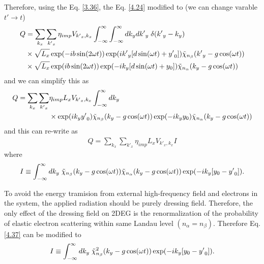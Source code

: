 \noindent
Therefore, using the Eq. \eqref{3.36}, the Eq. \eqref{4.24} modified to (we can change varable $t' \rightarrow t$)
\begin{equation} \label{4.34}
  \begin{aligned}
    Q & =
    \sum_{k_x}\sum_{{k'}_x}
    {\eta_{imp} V_{{k'}_x,k_x}}
    \int_{-\infty}^{\infty} \int_{-\infty}^{\infty} dk_y d{k'}_y \;
    \delta({k'}_y - k_y)
    \\
    & \times
    \sqrt{L_x}
    \exp(
      -ib\sin(2\omega t)
    )
    \exp(
      i{k'}_y  \qty[d\sin(\omega t) + {y'}_0]
    )
    \tilde{\chi}_{n_{\beta}}\qty({k'}_y -g\cos(\omega t))
    \\
    & \times
    \sqrt{L_x}
    \exp(
      ib\sin(2\omega t)
    )
    \exp(
      -ik_y  \qty[d\sin(\omega t) + y_0]
    )
    \tilde{\chi}_{n_{\alpha}}\qty(k_y -g\cos(\omega t))
  \end{aligned}
\end{equation}
and we can simplify this as
\begin{equation} \label{4.35}
  \begin{aligned}
    Q =
    \sum_{k_x}\sum_{{k'}_x} &
    {\eta_{imp} L_x V_{{k'}_x,k_x}}
    \int_{-\infty}^{\infty} dk_y \;
    \\
    & \times
    \exp(
      i{k}_y {y'}_0
    )
    \tilde{\chi}_{n_{\beta}}\qty({k}_y -g\cos(\omega t))
    \exp(
      -ik_y y_0
    )
    \tilde{\chi}_{n_{\alpha}}\qty(k_y -g\cos(\omega t))
  \end{aligned}
\end{equation}
and this can re-write as
\begin{equation} \label{4.36}
  \begin{aligned}
    Q =
    \sum_{k_x}\sum_{{k'}_x}
    {\eta_{imp} L_x V_{{k'}_x,k_x}} I
  \end{aligned}
\end{equation}
where
\begin{equation} \label{4.37}
  \begin{aligned}
    I \equiv
    \int_{-\infty}^{\infty} dk_y \;
    \tilde{\chi}_{n_{\beta}}\qty(k_y -g\cos(\omega t))
    \tilde{\chi}_{n_{\alpha}}\qty(k_y -g\cos(\omega t))
    \exp(
      -ik_y  \qty[y_0 - {y'}_0  ]
    ).
  \end{aligned}
\end{equation}

\noindent
To avoid the energy tramision from external high-frequency field and electrons in the system, the applied radiation should be purely dressing field. Therefore, the only effect of the dressing field on 2DEG is the renormalization of the probability of elastic electron scattering within same Landau level $(n_{\alpha} = n_{\beta})$. Therefore Eq. \eqref{4.37} can be modified to
\begin{equation} \label{4.38}
  \begin{aligned}
    I \equiv
    \int_{-\infty}^{\infty} dk_y \;
    \tilde{\chi}_{n_{\beta}}^2 \qty(k_y -g\cos(\omega t))
    \exp(
      -ik_y  \qty[y_0 - {y'}_0  ]
    ).
  \end{aligned}
\end{equation}


